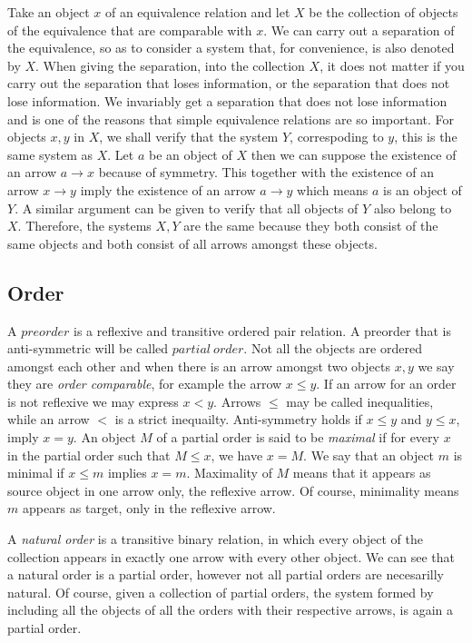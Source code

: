 \documentclass [12pt]{book}
\begin{document}
Take an object $x$ of an equivalence relation and let $X$ be the collection of objects of the equivalence that are comparable with $x$. We can carry out a separation of the equivalence, so as to consider a system that, for convenience, is also denoted by $X$. When giving the separation, into the collection $X$, it does not matter if you carry out the separation that loses information, or the separation that does not lose information. We invariably get a separation that does not lose information and is one of the reasons that simple equivalence relations are so important. For objects $x,y$ in $X$, we shall verify that the system $Y$, correspoding to $y$, this is the same system as $X$. Let $a$ be an object of $X$ then we can suppose the existence of an arrow $a\rightarrow x$ because of symmetry. This together with the existence of an arrow $x\rightarrow y$ imply the existence of an arrow $a\rightarrow y$ which means $a$ is an object of $Y$. A similar argument can be given to verify that all objects of $Y$ also belong to $X$. Therefore, the systems $X,Y$ are the same because they both consist of the same objects and both consist of all arrows amongst these objects.


		\subsection{Order}


A $preorder$ is a reflexive and transitive ordered pair relation. A preorder that is anti-symmetric will be called $partial~order$. Not all the objects are ordered amongst each other and when there is an arrow amongst two objects $x,y$ we say they are \textit{order comparable}, for example the arrow $x\leq y$. If an arrow for an order is not reflexive we may express $x<y$. Arrows $\leq$ may be called inequalities, while an arrow $<$ is a strict inequailty. Anti-symmetry holds if $x\leq y$ and $y\leq x$, imply $x=y$. An object $M$ of a partial order is said to be \textit{maximal} if for every $x$ in the partial order such that $M\leq x$, we have $x=M$. We say that an object $m$ is minimal if $x\leq m$ implies $x=m$. Maximality of $M$ means that it appears as source object in one arrow only, the reflexive arrow. Of course, minimality means $m$ appears as target, only in the reflexive arrow.

A \textit{natural order} is a transitive binary relation, in which every object of the collection appears in exactly one arrow with every other object. We can see that a natural order is a partial order, however not all partial orders are necesarilly natural. Of course, given a collection of partial orders, the system formed by including all the objects of all the orders with their respective arrows, is again a partial order. 
\end{document}
